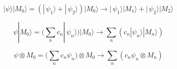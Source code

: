 \documentclass[20pt]{extreport}
\def\a{|\,\psi_1\rangle}
\def\b{|\,\psi_2\rangle}
\def\da{|M_{1}\rangle}
\def\db{|M_{2}\rangle}
\def\m0{| M_0 \rangle}
\def\M0{ M_0 }
\begin{document}
$$\displaystyle |\psi\rangle \m0 = (\a + \b)\m0 \to   \a\da + \b\db
$$

$$\displaystyle \psi  \m0 = \big(\sum_n c_n|\,\psi_n\rangle\big)  \m0 \to  \sum_n (c_n |\psi_n\rangle  |M_n\rangle)
$$

$$\displaystyle \psi  \otimes \M0 = \big(\sum_n c_n\psi_n\big) \otimes \M0 \to  \sum_n (c_n \psi_n  \otimes M_n)
$$
\end{document}
